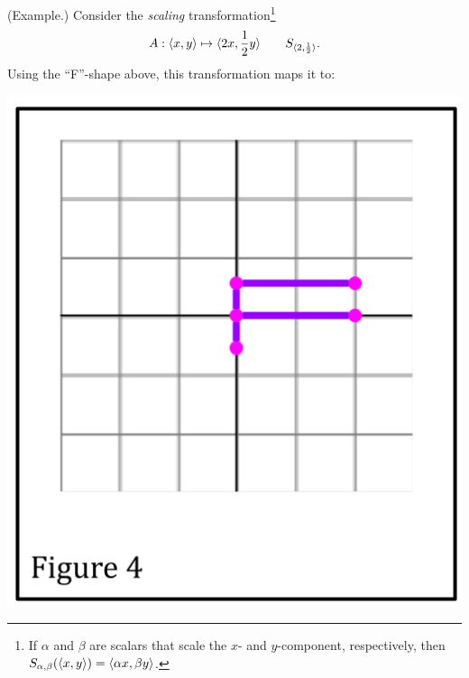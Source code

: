 \documentclass[letterpaper]{article}
\begin{document}
\begin{mdframed}[]
    (Example.) Consider the \emph{scaling} transformation\footnote{If $\alpha$ and $\beta$ are scalars that scale the $x$- and $y$-component, respectively, then $S_{\alpha, \beta}(\langle x, y \rangle) = \langle \alpha x, \beta y \rangle$.}
    \[A: \langle x, y \rangle \mapsto \langle 2x, \frac{1}{2}y \rangle \qquad S_{\langle 2, \frac{1}{2} \rangle}.\]
    Using the ``F''-shape above, this transformation maps it to: 
    \begin{center}
        \includegraphics[scale=0.3]{../assets/f3.png}
    \end{center}
\end{mdframed}
\end{document}
